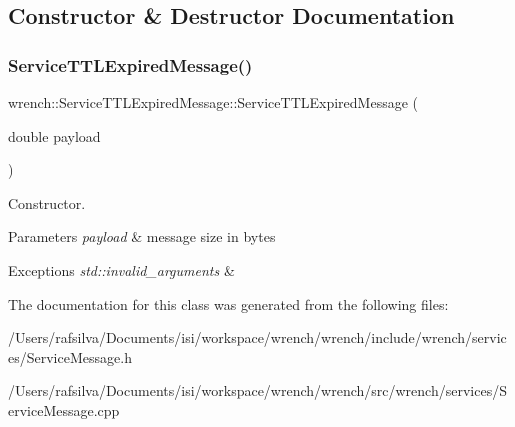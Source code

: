 \subsection{Constructor \& Destructor Documentation}
\mbox{\label{classwrench_1_1_service_t_t_l_expired_message_a065b4c81b01a865e9944efb69769e785}} 
\subsubsection{\texorpdfstring{Service\+T\+T\+L\+Expired\+Message()}{ServiceTTLExpiredMessage()}}
{\footnotesize\ttfamily wrench\+::\+Service\+T\+T\+L\+Expired\+Message\+::\+Service\+T\+T\+L\+Expired\+Message (\begin{DoxyParamCaption}\item[{double}]{payload }\end{DoxyParamCaption})}



Constructor. 


\begin{DoxyParams}{Parameters}
{\em payload} & message size in bytes\\
\hline
\end{DoxyParams}

\begin{DoxyExceptions}{Exceptions}
{\em std\+::invalid\+\_\+arguments} & \\
\hline
\end{DoxyExceptions}


The documentation for this class was generated from the following files\+:\begin{DoxyCompactItemize}
\item 
/\+Users/rafsilva/\+Documents/isi/workspace/wrench/wrench/include/wrench/services/Service\+Message.\+h\item 
/\+Users/rafsilva/\+Documents/isi/workspace/wrench/wrench/src/wrench/services/Service\+Message.\+cpp\end{DoxyCompactItemize}
